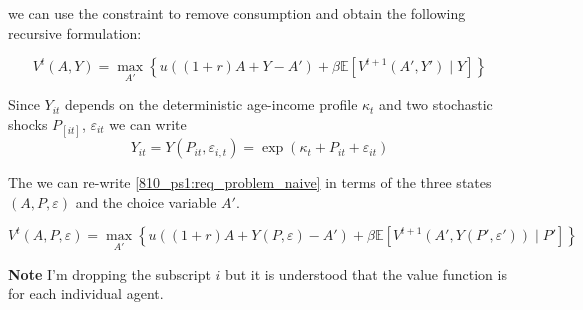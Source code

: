 \documentclass[12pt]{article}
\begin{document}
we can use the constraint to remove consumption and obtain the following recursive formulation:

\begin{equation}\label{810_ps1:req_problem_naive}
    V^t(A, Y) = \max_{A'}\left\{u\left( (1+r)A+Y - A'\right) + \beta \mathbb{E}\left[ V^{t+1}(A', Y') \mid Y \right] \right\}
\end{equation}

Since $Y_{it}$ depends on the deterministic age-income profile $\kappa_t$ and two stochastic shocks $P_[it]$, $\varepsilon_{it}$ we can write $$Y_{it} = Y(P_{it}, \varepsilon_{i,t}) = \exp{(\kappa_t + P_{it} + \varepsilon_{it})}$$

The we can re-write \eqref{810_ps1:req_problem_naive} in terms of the three states $(A, P, \varepsilon)$ and the choice variable $A'$.

\begin{equation}\label{810_ps1:req_problem}
     V^t(A, P, \varepsilon) = \max_{A'}\left\{u\left( (1+r)A+ Y(P, \varepsilon) - A'\right) + \beta \mathbb{E}\left[ V^{t+1}(A', Y(P', \varepsilon')) \mid P' \right] \right\}
\end{equation}

\textbf{Note} I'm dropping the subscript $i$ but it is understood that the value function is for each individual agent.





\end{document}
